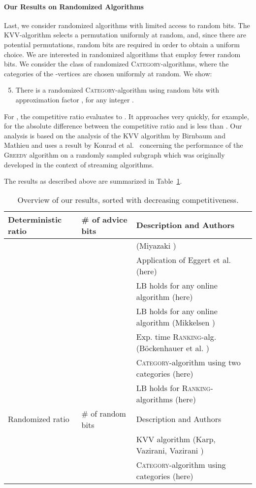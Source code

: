 \documentclass[a4paper]{article}
\newcommand{\KVV}{\textsc{KVV}}
\begin{document}
\paragraph*{Our Results on Randomized Algorithms}
Last, we consider randomized algorithms with limited access to random bits. The \KVV-algorithm selects a
permutation  uniformly at random, and, since there are  potential permutations,
 random bits are required in order to obtain a uniform choice.
We are interested in randomized algorithms that employ fewer random bits. We
consider the class of randomized \textsc{Category}-algorithms, where the categories of the -vertices
are chosen uniformly at random. We show:
\begin{enumerate}
\setcounter{enumi}{4} \item
 There is a randomized \textsc{Category}-algorithm using  random bits
 with approximation factor , for any integer .
\end{enumerate}
For , the competitive ratio evaluates to . It approaches  very quickly, for example,
for  the absolute difference between the competitive ratio and  is less than
.
Our analysis is based on the analysis of the \textsc{KVV} algorithm by Birnbaum and Mathieu \cite{bm08}
and uses a result by Konrad et al.~\cite{kmm12}
concerning the performance of the \textsc{Greedy}
algorithm on a randomly sampled subgraph which was originally developed in the context of streaming algorithms.

The results as described above are summarized in Table~\ref{tab:results}.

\begin{table}[ht]
\small
\begin{center}
 \begin{tabularx}{\textwidth}{|llX|}
\hline
Deterministic ratio & \# of advice bits & Description and Authors    \\
\hline
 &  & (Miyazaki \cite{m14}) \\
 &  & Application of Eggert et al. \cite{ekms11} (here) \\
 &  & LB holds for any online algorithm (here) \\
 &  & LB holds for any online algorithm (Mikkelsen \cite{m15}) \\
 &   & Exp. time \textsc{Ranking}-alg. (Böckenhauer et al. \cite{bkkk11}) \\
 &  & \textsc{Category}-algorithm using two categories (here) \\
 &  &  LB holds for \textsc{Ranking}-algorithms (here) \\
\hline
Randomized ratio & \# of random bits & Description and Authors    \\
\hline
 &  & \textsc{KVV} algorithm (Karp, Vazirani, Vazirani \cite{kvv90}) \\
 &  &   \textsc{Category}-algorithm using  categories (here)\\
\hline
\end{tabularx}
\caption{Overview of our results, sorted with decreasing competitiveness. \label{tab:results}}
\end{center}
\end{table}
\end{document}
